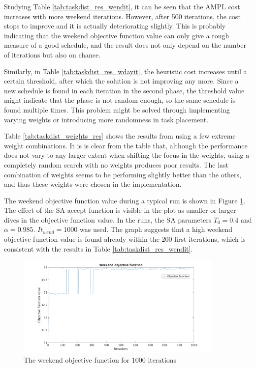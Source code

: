 Studying Table \ref{tab:taskdist_res_wendit}, it can be seen that the AMPL cost increases with more weekend iterations. However, after 500 iterations, the cost stops to improve and it is actually deteriorating slightly. This is probably indicating that the weekend objective function value can only give a rough measure of a good schedule, and the result does not only depend on the number of iterations but also on chance. 

Similarly, in Table \ref{tab:taskdist_res_wdayit}, the heuristic cost increases until a certain threshold, after which the solution is not improving any more. Since a new schedule is found in each iteration in the second phase, the threshold value might indicate that the phase is not random enough, so the same schedule is found multiple times. This problem might be solved through implementing varying weights or introducing more randomness in task placement.

Table \ref{tab:taskdist_weights_res} shows the results from using a few extreme weight combinations. It is is clear from the table that, although the performance does not vary to any larger extent when shifting the focus in the weights, using a completely random search with no weights produces poor results. The last combination of weights seems to be performing slightly better than the others, and thus these weights were chosen in the implementation.

The weekend objective function value during a typical run is shown in Figure \ref{fig:obj_fun_vals}. The effect of the SA accept function is visible in the plot as smaller or larger dives in the objective function value. In the runs, the SA parameters $T_0 = 0.4$ and $\alpha = 0.985$. $It_{wend} = 1000$ was used. The graph suggests that a high weekend objective function value is found already within the 200 first iterations, which is consistent with the results in Table \ref{tab:taskdist_res_wendit}.

\begin{figure}[!htbp]
\centering
\includegraphics[width=0.9\textwidth, trim = 100px 0px 100px 20px, clip]{Chapters/ImagesEmelie/Plot_1000_20.png}
\caption{The weekend objective function for 1000 iterations}
\label{fig:obj_fun_vals}
\end{figure}


